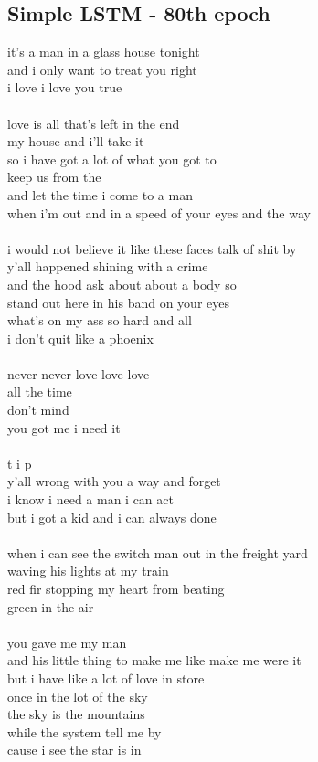 \documentclass[conference]{IEEEtran}
\begin{document}
\subsection{Simple LSTM - 80th epoch}\label{LSTM80}
it's a man in a glass house tonight \\
and i only want to treat you right \\
i love i love you true \\
 \\
love is all that's left in the end \\
my house and i'll take it \\
so i have got a lot of what you got to \\
keep us from the \\
and let the time i come to a man \\
when i'm out and in a speed of your eyes and the way \\
 \\
i would not believe it like these faces talk of shit by \\
y'all happened shining with a crime \\
and the hood ask about about a body so \\
stand out here in his band on your eyes \\
what's on my ass so hard and all \\
i don't quit like a phoenix \\
 \\
never never love love love \\
all the time \\
don't mind \\
you got me i need it \\
 \\
t i p \\
y'all wrong with you a way and forget \\
i know i need a man i can act \\
but i got a kid and i can always done \\
 \\
when i can see the switch man out in the freight yard \\
waving his lights at my train \\
red fir stopping my heart from beating \\
green in the air \\
 \\
you gave me my man \\
and his little thing to make me like make me were it \\
but i have like a lot of love in store \\
once in the lot of the sky \\
the sky is the mountains \\
while the system tell me by \\
cause i see the star is in \\
\end{document}
